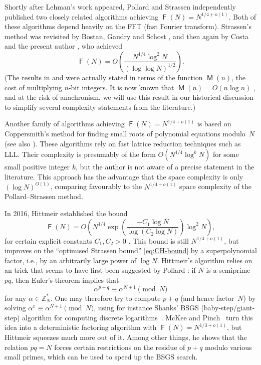 \documentclass[reqno]{amsart}
\theoremstyle{remark}
\numberwithin{equation}{section}
\numberwithin{thm}{section}
\newcommand{\ZZ}{\mathbb{Z}}
\DeclareMathOperator{\FF}{\mathsf{F}}
\DeclareMathOperator{\MM}{\mathsf{M}}
\begin{document}
Shortly after Lehman's work appeared,
Pollard \cite{Pol-factorization} and Strassen \cite{Str-factoring}
independently published two closely related algorithms achieving
$\FF(N) = N^{1/4+o(1)}$.
Both of these algorithms depend heavily on the FFT
(fast Fourier transform).
Strassen's method was revisited by Bostan, Gaudry and Schost
\cite{BGS-recurrences},
and then again by Costa and the present author \cite{CH-factor},
who achieved
\begin{equation}
\label{eq:CH-bound}
  \FF(N) = O\left(\frac{N^{1/4} \log^2 N}{(\log \log N)^{1/2}}\right).
\end{equation}
(The results in \cite{BGS-recurrences} and \cite{CH-factor}
were actually stated in terms of the function $\MM(n)$,
the cost of multiplying $n$-bit integers.
It is now known that $\MM(n) = O(n \log n)$ \cite{HvdH-nlogn},
and at the risk of anachronism,
we will use this result in our historical discussion to simplify
several complexity statements from the literature.)

Another family of algorithms achieving $\FF(N) = N^{1/4+o(1)}$
is based on Coppersmith's method \cite{Cop-lowexponent}
for finding small roots of polynomial equations modulo~$N$
(see also \cite[\S5]{Ber-smallheight}).
These algorithms rely on fast lattice reduction techniques such as LLL.
Their complexity is presumably of the form $O(N^{1/4} \log^k N)$
for some small positive integer $k$,
but the author is not aware of a precise statement in the literature.
This approach has the advantage that the space complexity is only
$(\log N)^{O(1)}$,
comparing favourably to the $N^{1/4+o(1)}$ space complexity of the
Pollard--Strassen method.

In 2016, Hittmeir established the bound
\begin{equation}
\label{eq:hittmeir-bound1}
  \FF(N) = O\left(N^{1/4} \exp\left(\frac{-C_1 \log N}{\log (C_2 \log N)}\right) \log^2 N\right),
\end{equation}
for certain explicit constants $C_1, C_2 > 0$ \cite{Hit-BSGS}.
This bound is still $N^{1/4+o(1)}$,
but improves on the ``optimised Strassen bound'' \eqref{eq:CH-bound} by a superpolynomial factor,
i.e., by an arbitrarily large power of $\log N$.
Hittmeir's algorithm relies on an trick that seems to have first been suggested
by Pollard \cite[\S3]{Pol-montecarlo}:
if $N$ is a semiprime $pq$, then Euler's theorem implies that
\begin{equation}
\label{eq:hittmeir-congruence}
  \alpha^{p+q} \equiv \alpha^{N+1} \pmod N
\end{equation}
for any $\alpha \in \ZZ_N^*$.
One may therefore try to compute $p+q$ (and hence factor~$N$)
by solving $\alpha^x \equiv \alpha^{N+1} \pmod N$,
using for instance Shanks' BSGS (baby-step/giant-step) algorithm
for computing discrete logarithms~\cite{Sha-classnumber}.
McKee and Pinch~\cite[\S2]{MP-oldandnew} turn this idea into a deterministic
factoring algorithm with $\FF(N) = N^{1/3+o(1)}$,
but Hittmeir squeezes much more out of it.
Among other things, he shows that the relation $pq = N$ forces certain
restrictions on the residue of $p+q$ modulo various small primes,
which can be used to speed up the BSGS search.
\end{document}
